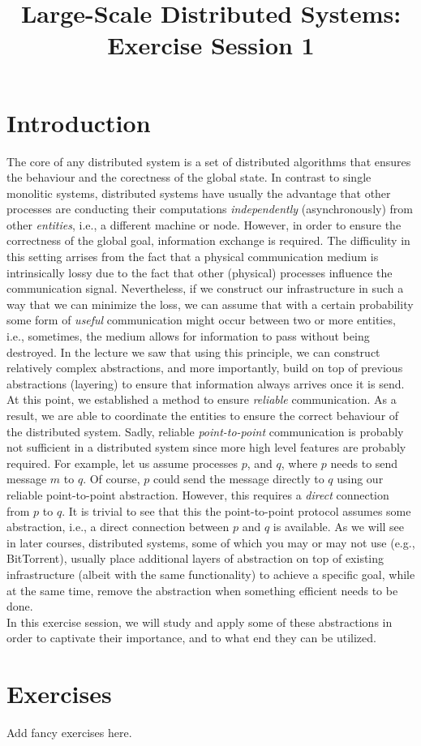 

\title{Large-Scale Distributed Systems: Exercise Session 1}
\maketitle

\section{Introduction}
\label{sec:introduction}

The core of any distributed system is a set of distributed algorithms that ensures the behaviour and the corectness of the global state. In contrast to single monolitic systems, distributed systems have usually the advantage that other processes are conducting their computations \emph{independently} (asynchronously) from other \emph{entities}, i.e., a different machine or node. However, in order to ensure the correctness of the global goal, information exchange is required. The difficulity in this setting arrises from the fact that a physical communication medium is intrinsically lossy due to the fact that other (physical) processes influence the communication signal. Nevertheless, if we construct our infrastructure in such a way that we can minimize the loss, we can assume that with a certain probability some form of \emph{useful} communication might occur between two or more entities, i.e., sometimes, the medium allows for information to pass without being destroyed. In the lecture we saw that using this principle, we can construct relatively complex abstractions, and more importantly, build on top of previous abstractions (layering) to ensure that information always arrives once it is send.\\

At this point, we established a method to ensure \emph{reliable} communication. As a result, we are able to coordinate the entities to ensure the correct behaviour of the distributed system. Sadly, reliable \emph{point-to-point} communication is probably not sufficient in a distributed system since more high level features are probably required. For example, let us assume processes $p$, and $q$, where $p$ needs to send message $m$ to $q$. Of course, $p$ could send the message directly to $q$ using our reliable point-to-point abstraction. However, this requires a \emph{direct} connection from $p$ to $q$. It is trivial to see that this the point-to-point protocol assumes some abstraction, i.e., a direct connection between $p$ and $q$ is available. As we will see in later courses, distributed systems, some of which you may or may not use (e.g., BitTorrent), usually place additional layers of abstraction on top of existing infrastructure (albeit with the same functionality) to achieve a specific goal, while at the same time, remove the abstraction when something efficient needs to be done.\\

In this exercise session, we will study and apply some of these abstractions in order to captivate their importance, and to what end they can be utilized.

\section{Exercises}
\label{sec:exercises}

Add fancy exercises here.


